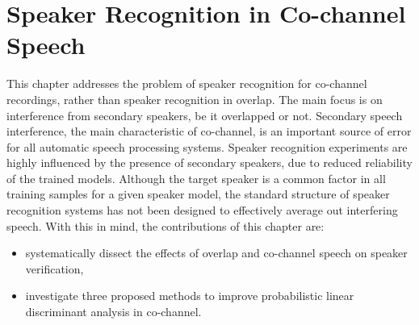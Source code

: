 
\chapter{Speaker Recognition in Co-channel Speech}
\label{chapter:backend}


This chapter addresses the problem of speaker recognition for co-channel recordings, rather than speaker recognition in overlap. 
The main focus is on interference from secondary speakers, be it overlapped or not. 
Secondary speech interference, the main characteristic of co-channel, is an important source of error for all automatic speech processing systems. Speaker recognition experiments are highly influenced by the presence of secondary speakers, due to reduced reliability of the trained models. 
Although the target speaker is a common factor in all training samples for a given speaker model, the standard structure of speaker recognition systems has not been designed to effectively average out interfering speech. With this in mind, the contributions of this chapter are:
\begin{itemize}
	\item systematically dissect the effects of overlap and co-channel speech on speaker verification, 
	\item investigate three proposed methods to improve probabilistic linear discriminant analysis in co-channel. 
\end{itemize}

